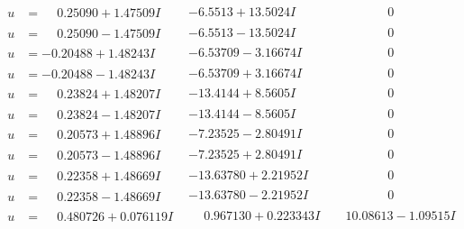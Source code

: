 \documentclass[1p]{elsarticle_modified}
\theoremstyle{definition}
\begin{document}
$$\begin{array}{c|c|c}
\begin{aligned}
u &= \phantom{-}0.25090 + 1.47509 I\end{aligned}
 & -6.5513 + 13.5024 I & \phantom{-0.000000 } 0 \\ \hline\begin{aligned}
u &= \phantom{-}0.25090 - 1.47509 I\end{aligned}
 & -6.5513 - 13.5024 I & \phantom{-0.000000 } 0 \\ \hline\begin{aligned}
u &= -0.20488 + 1.48243 I\end{aligned}
 & -6.53709 - 3.16674 I & \phantom{-0.000000 } 0 \\ \hline\begin{aligned}
u &= -0.20488 - 1.48243 I\end{aligned}
 & -6.53709 + 3.16674 I & \phantom{-0.000000 } 0 \\ \hline\begin{aligned}
u &= \phantom{-}0.23824 + 1.48207 I\end{aligned}
 & -13.4144 + 8.5605 I & \phantom{-0.000000 } 0 \\ \hline\begin{aligned}
u &= \phantom{-}0.23824 - 1.48207 I\end{aligned}
 & -13.4144 - 8.5605 I & \phantom{-0.000000 } 0 \\ \hline\begin{aligned}
u &= \phantom{-}0.20573 + 1.48896 I\end{aligned}
 & -7.23525 - 2.80491 I & \phantom{-0.000000 } 0 \\ \hline\begin{aligned}
u &= \phantom{-}0.20573 - 1.48896 I\end{aligned}
 & -7.23525 + 2.80491 I & \phantom{-0.000000 } 0 \\ \hline\begin{aligned}
u &= \phantom{-}0.22358 + 1.48669 I\end{aligned}
 & -13.63780 + 2.21952 I & \phantom{-0.000000 } 0 \\ \hline\begin{aligned}
u &= \phantom{-}0.22358 - 1.48669 I\end{aligned}
 & -13.63780 - 2.21952 I & \phantom{-0.000000 } 0 \\ \hline\begin{aligned}
u &= \phantom{-}0.480726 + 0.076119 I\end{aligned}
 & \phantom{-}0.967130 + 0.223343 I & \phantom{-}10.08613 - 1.09515 I \\ \hline\begin{aligned}

\end{aligned}
\end{array}$$
\end{document}
